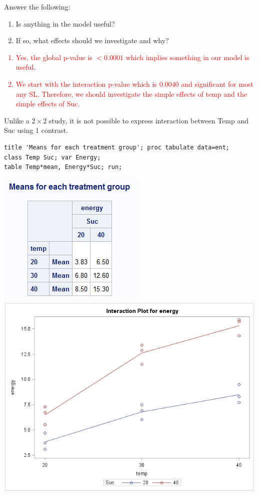 Answer the following:
\begin{enumerate}
\item Is anything in the model useful?
\item If so, what effects should we investigate and why?
\end{enumerate}
\textcolor{red}{\begin{enumerate}
\item Yes, the global p-value is $<0.0001$ which implies something in our model is useful.
\item We start with the interaction p-value which is 0.0040 and significant for most any SL. Therefore, we should investigate the simple effects of temp and the simple effects of Suc.
\end{enumerate}
}

\newpage
Unlike a $2\times2$ study, it is not possible to express interaction between Temp and Suc using 1 contrast.

\begin{small}
\begin{verbatim}
title 'Means for each treatment group'; proc tabulate data=ent;
class Temp Suc; var Energy;
table Temp*mean, Energy*Suc; run;
\end{verbatim}
\end{small}

\begin{center}
\includegraphics[scale=0.9]{EntMeans}\includegraphics[scale=0.6]{Ent2}
\end{center}

